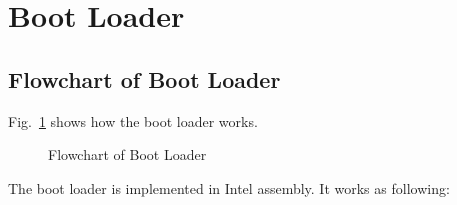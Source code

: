 \documentclass{swfcthesis}
\begin{document}
\section{Boot Loader}

\subsection{Flowchart of Boot Loader}
\label{sec:flowch-boot-load}

Fig.~\ref{fig:flowchart-of-boot-loader} shows how the boot loader works.

\begin{figure}[!ht]
  \centering
  \caption{Flowchart of Boot Loader}
  \label{fig:flowchart-of-boot-loader}
\end{figure}

The boot loader is implemented in Intel assembly. It works as following:
\end{document}
